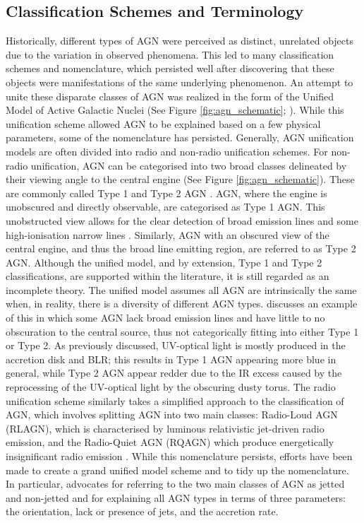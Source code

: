 \subsection{Classification Schemes and Terminology}
Historically, different types of AGN were perceived as distinct, unrelated objects due to the variation in observed phenomena. This led to many classification schemes and nomenclature, which persisted well after discovering that these objects were manifestations of the same underlying phenomenon. An attempt to unite these disparate classes of AGN was realized in the form of the Unified Model of Active Galactic Nuclei (See Figure \ref{fig:agn_schematic}; \citealt{rowan-robinson_unity_1977, antonucci_unified_1993, urry_unified_1995}). While this unification scheme allowed AGN to be explained based on a few physical parameters, some of the nomenclature has persisted. Generally, AGN unification models are often divided into radio and non-radio unification schemes. For non-radio unification, AGN can be categorised into two broad classes delineated by their viewing angle to the central engine (See Figure \ref{fig:agn_schematic}). These are commonly called Type 1 and Type 2 AGN \citep{netzer_revisiting_2015}. AGN, where the engine is unobscured and directly observable, are categorised as Type 1 AGN. This unobstructed view allows for the clear detection of broad emission lines and some high-ionisation narrow lines \citep{antonucci_spectropolarimetry_1985}. Similarly, AGN with an obscured view of the central engine, and thus the broad line emitting region, are referred to as Type 2 AGN. Although the unified model, and by extension, Type 1 and Type 2 classifications, are supported within the literature, it is still regarded as an incomplete theory. The unified model assumes all AGN are intrinsically the same when, in reality, there is a diversity of different AGN types. \cite{elitzur_disc_2016} discusses an example of this in which some AGN lack broad emission lines and have little to no obscuration to the central source, thus not categorically fitting into either Type 1 or Type 2. As previously discussed, UV-optical light is mostly produced in the accretion disk and BLR; this results in Type 1 AGN appearing more blue in general, while Type 2 AGN appear redder due to the IR excess caused by the reprocessing of the UV-optical light by the obscuring dusty torus. The radio unification scheme similarly takes a simplified approach to the classification of AGN, which involves splitting AGN into two main classes: Radio-Loud AGN (RLAGN), which is characterised by luminous relativistic jet-driven radio emission, and the Radio-Quiet AGN (RQAGN) which produce energetically insignificant radio emission \citep{wilson_difference_1995}. While this nomenclature persists, efforts have been made to create a grand unified model scheme and to tidy up the nomenclature. In particular, \cite{padovani_two_2017} advocates for referring to the two main classes of AGN as jetted and non-jetted and for explaining all AGN types in terms of three parameters: the orientation, lack or presence of jets, and the accretion rate. 